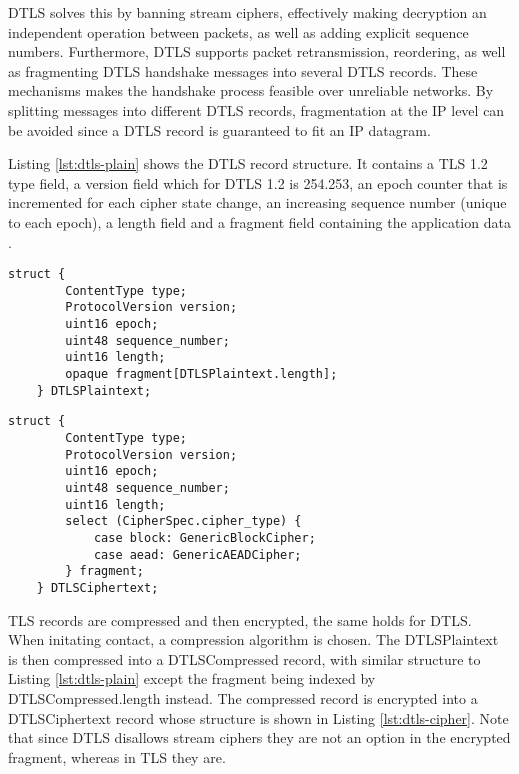 \documentclass[0-thesis.tex]{subfiles}
\begin{document}
DTLS solves this by banning stream ciphers, effectively making decryption an independent 
operation between packets, as well as adding explicit sequence numbers. Furthermore, DTLS 
supports packet retransmission, reordering, as well as fragmenting DTLS handshake messages 
into several DTLS records. These mechanisms makes the handshake process feasible over 
unreliable networks. By splitting messages into different DTLS records, fragmentation at the 
IP level can be avoided since a DTLS record is guaranteed to fit an IP datagram.

Listing \ref{lst:dtls-plain} shows the DTLS record structure. It contains a TLS 1.2 type field, 
a version field which for DTLS 1.2 is 254.253, an epoch counter that is incremented for 
each cipher state change, an increasing sequence number (unique to each epoch), a length 
field and a fragment field containing the application data \parencite{rfc5246}.

\lstset{language=C}
\begin{lstlisting}[caption={The DTLS plaintext record structure.}, label={lst:dtls-plain}]
    struct {
        ContentType type;
        ProtocolVersion version;
        uint16 epoch;
        uint48 sequence_number;
        uint16 length;
        opaque fragment[DTLSPlaintext.length];
    } DTLSPlaintext;
\end{lstlisting}

\begin{lstlisting}[caption={The DTLS ciphertext record structure.}, label={lst:dtls-cipher}]
    struct {
        ContentType type;
        ProtocolVersion version;
        uint16 epoch;
        uint48 sequence_number;
        uint16 length;
        select (CipherSpec.cipher_type) {
            case block: GenericBlockCipher;
            case aead: GenericAEADCipher;
        } fragment;
    } DTLSCiphertext;
\end{lstlisting}

TLS records are compressed and then encrypted, the same holds for DTLS. When initating 
contact, a compression algorithm is chosen. The DTLSPlaintext is then compressed into a 
DTLSCompressed record, with similar structure to Listing \ref{lst:dtls-plain} except the 
fragment being indexed by DTLSCompressed.length instead. The compressed record is 
encrypted into a DTLSCiphertext record whose structure is shown in Listing \ref{lst:dtls-cipher}.
Note that since DTLS disallows stream ciphers they are not an option in the encrypted fragment,
whereas in TLS they are.
\end{document}
